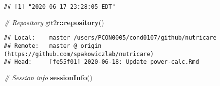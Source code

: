\documentclass[]{article}
\newenvironment{Shaded}{\begin{snugshade}}{\end{snugshade}}
\newcommand{\CommentTok}[1]{\textcolor[rgb]{0.56,0.35,0.01}{\textit{#1}}}
\newcommand{\KeywordTok}[1]{\textcolor[rgb]{0.13,0.29,0.53}{\textbf{#1}}}
\newcommand{\NormalTok}[1]{#1}
\newcommand{\OperatorTok}[1]{\textcolor[rgb]{0.81,0.36,0.00}{\textbf{#1}}}
\begin{document}
\begin{verbatim}
## [1] "2020-06-17 23:28:05 EDT"
\end{verbatim}

\begin{Shaded}
\begin{Highlighting}[]
\CommentTok{# Repository}
\NormalTok{git2r}\OperatorTok{::}\KeywordTok{repository}\NormalTok{()}
\end{Highlighting}
\end{Shaded}

\begin{verbatim}
## Local:    master /users/PCON0005/cond0107/github/nutricare
## Remote:   master @ origin (https://github.com/spakowiczlab/nutricare)
## Head:     [fe55f01] 2020-06-18: Update power-calc.Rmd
\end{verbatim}

\begin{Shaded}
\begin{Highlighting}[]
\CommentTok{# Session info}
\KeywordTok{sessionInfo}\NormalTok{()}
\end{Highlighting}
\end{Shaded}
\end{document}

